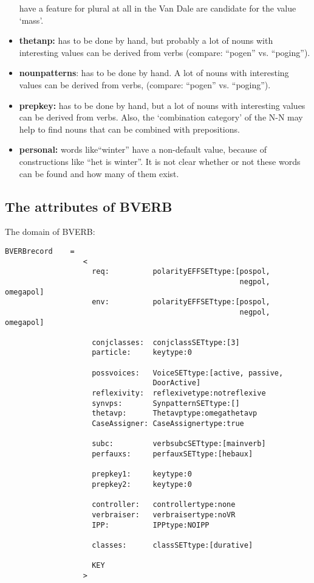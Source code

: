 \begin{itemize}
        have a feature for plural at all in the Van Dale are candidate for the 
        value `mass'.
  \item {\bf thetanp:} has to be done by hand, but probably a lot of nouns with 
        interesting values can be derived from verbs (compare: ``pogen'' vs. 
        ``poging'').
  \item {\bf nounpatterns}: has to be done by hand. A lot of nouns with 
        interesting values can be derived from verbs, (compare: ``pogen'' vs. 
        ``poging'').
  \item {\bf prepkey:} has to be done by hand, but a lot of nouns with 
        interesting values can be derived from verbs. Also, the 
        `combination category' of the N-N may help to find nouns that can 
        be combined with prepositions.
  \item {\bf personal:} words like``winter'' have a non-default value, because 
        of 
        constructions like ``het is winter''. It is not clear whether or not 
        these words can be found and how many of them exist.
\end{itemize}
 
\subsection{The attributes of BVERB}
 
The domain of BVERB:
 
\begin{verbatim}
BVERBrecord    =
                  <
                    req:          polarityEFFSETtype:[pospol, 
                                                      negpol, omegapol]
                    env:          polarityEFFSETtype:[pospol, 
                                                      negpol, omegapol]
 
                    conjclasses:  conjclassSETtype:[3]  
                    particle:     keytype:0  
 
                    possvoices:   VoiceSETtype:[active, passive, 
                                  DoorActive]     
                    reflexivity:  reflexivetype:notreflexive
                    synvps:       SynpatternSETtype:[]
                    thetavp:      Thetavptype:omegathetavp
                    CaseAssigner: CaseAssignertype:true
 
                    subc:         verbsubcSETtype:[mainverb]
                    perfauxs:     perfauxSETtype:[hebaux]   
 
                    prepkey1:     keytype:0
                    prepkey2:     keytype:0 
 
                    controller:   controllertype:none
                    verbraiser:   verbraisertype:noVR               
                    IPP:          IPPtype:NOIPP                        
 
                    classes:      classSETtype:[durative]
 
                    KEY
                  >
\end{verbatim}
 
